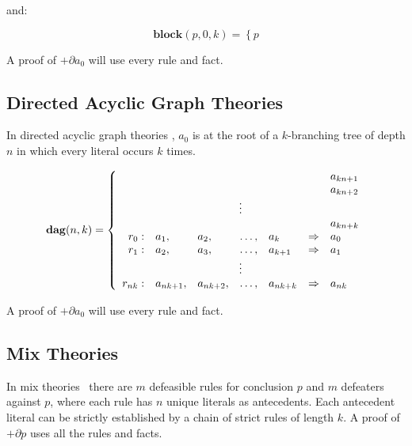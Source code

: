 {\noindent and: 

\[\mathbf{block}(p,0,k) = \left\{ p \right.\]

A proof of $+\partial a_{0}$ will use every rule and 
fact.



\subsection{Directed Acyclic Graph Theories} %

\label{dagTheories}

In directed acyclic graph theories \dagTh,
$a_{0}$ is at the root of a $k$-branching tree of
depth $n$ in which every literal occurs $k$ times.

\[\mathbf{dag}(n,k) =  \left\{ \begin{array}{rllllll}
   & & & & & & a_{kn+1} \\
   & & & & & & a_{kn+2} \\
   \multicolumn{7}{c}{\vdots} \\
   & & & & & & a_{kn+k} \\
   r_{0}: & a_{1}, & a_{2}, & \ldots , & a_{k} & \Rightarrow & a_{0} \\
   r_{1}: & a_{2}, & a_{3}, & \ldots , & a_{k+1} & \Rightarrow & a_{1} \\
   \multicolumn{7}{c}{\vdots} \\
   r_{nk}: & a_{nk+1}, & a_{nk+2}, & \ldots , & a_{nk+k} & \Rightarrow & a_{nk} \\
\end{array} \right.\]

A proof of $+\partial a_{0}$ will use every rule and 
fact.



\subsection{Mix Theories} %

\label{mixTheories}

In mix theories \mixTh\ there are $m$
defeasible rules for conclusion $p$ and $m$ defeaters
against $p$, where each rule has $n$ unique literals
as antecedents. Each antecedent literal can be strictly
established by a chain of strict rules of length $k$.
A proof of $+\partial p$ uses all the rules and facts.

}
